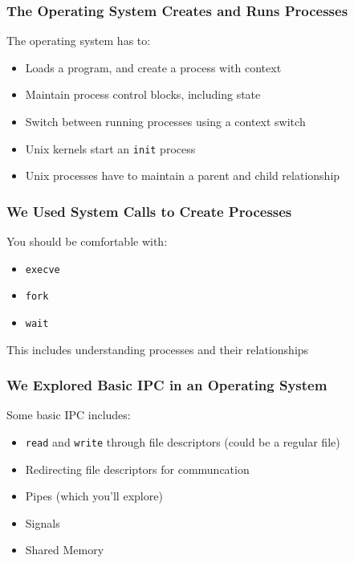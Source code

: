   \begin{frame}
    \frametitle{The Operating System Creates and Runs Processes}

    The operating system has to:
    \begin{itemize}
      \item Loads a program, and create a process with context
      \item Maintain process control blocks, including state
      \item Switch between running processes using a context switch
      \item Unix kernels start an \texttt{init} process
      \item Unix processes have to maintain a parent and child relationship
    \end{itemize}
  \end{frame}

  \begin{frame}
    \frametitle{We Used System Calls to Create Processes}

    You should be comfortable with:
    \begin{itemize}
      \item \texttt{execve}
      \item \texttt{fork}
      \item \texttt{wait}
    \end{itemize}

    \vspace{2em}

    This includes understanding processes and their relationships
  \end{frame}

  \begin{frame}
    \frametitle{We Explored Basic IPC in an Operating System}

    Some basic IPC includes:
    \begin{itemize}
      \item \texttt{read} and \texttt{write} through file descriptors (could be a regular file)
      \item Redirecting file descriptors for communcation
      \item Pipes (which you'll explore)
      \item Signals
      \item Shared Memory
    \end{itemize}
  \end{frame}

